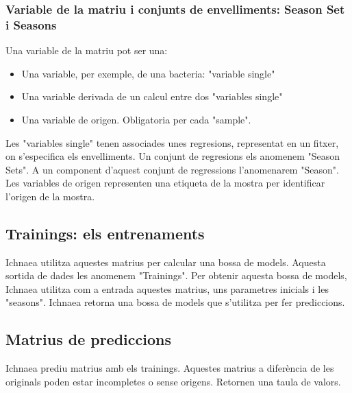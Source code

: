 \subsubsection{Variable de la matriu i conjunts de envelliments: Season Set i Seasons}
Una variable de la matriu pot ser una:\\
\begin{itemize}
\item Una variable, per exemple, de una bacteria: "variable single"
\item Una variable derivada de un calcul entre dos "variables single"
\item Una variable de origen. Obligatoria per cada "sample".
\end{itemize}
Les "variables single" tenen associades unes regresions, representat en un fitxer, on s'especifica els envelliments. Un conjunt de regresions els anomenem "Season Sets". A un component d'aquest conjunt de regressions l'anomenarem "Season".\\

Les variables de origen representen una etiqueta de la mostra per identificar l'origen de la mostra.\\

\subsection{Trainings: els entrenaments}
Ichnaea utilitza aquestes matrius per calcular una bossa de models. Aquesta sortida de dades les anomenem "Trainings". Per obtenir aquesta bossa de models, Ichnaea utilitza com a entrada aquestes matrius, uns parametres inicials i les "seasons". Ichnaea retorna una bossa de models que s'utilitza per fer prediccions.

\subsection{Matrius de prediccions}
Ichnaea prediu matrius amb els trainings. Aquestes matrius a difer\`{e}ncia de les originals poden estar incompletes o sense origens. Retornen una taula de valors.



